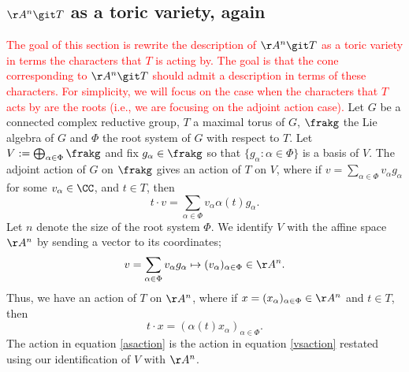 \subsection{$\AA^n \git T$ as a toric variety, again}
\textcolor{red}{The goal of this section is rewrite the description of $\AA^n \git T$ as a toric variety in terms the characters that $T$ is acting by.
The goal is that the cone corresponding to $\AA^n \git T$ should admit a description in terms of these characters.
For simplicity, we will focus on the case when the characters that $T$ acts by are the roots (i.e., we are focusing on the adjoint action case).}
Let $G$ be a connected complex reductive group, $T$ a maximal torus of $G$, $\frakg$ the Lie algebra of $G$ and $\Phi$ the root system of $G$ with respect to $T$.
Let $V := \bigoplus_{\alpha \in \Phi} \frakg$ and fix $g_\alpha \in \frakg$ so that $\{g_\alpha : \alpha \in \Phi\}$ is a basis of $V$.
The adjoint action of $G$ on $\frakg$ gives an action of $T$ on $V$, where if $v = \sum_{\alpha\in\Phi} v_\alpha g_\alpha$ for some $v_\alpha \in \CC$, and $t \in T$, then
\begin{equation}\label{vsaction}
t \cdot v = \sum_{\alpha \in \Phi} v_\alpha \alpha(t) g_\alpha.
\end{equation}
Let $n$ denote the size of the root system $\Phi$.
We identify $V$ with the affine space $\AA^n$ by sending a vector to its coordinates;
$$v = \sum_{\alpha \in \Phi} v_\alpha g_\alpha \mapsto (v_{\alpha})_{\alpha \in \Phi} \in \AA^n.$$
Thus, we have an action of $T$ on $\AA^n$, where if $x =(x_\alpha)_{\alpha\in\Phi} \in \AA^n$ and $t \in T$, then
\begin{equation}\label{asaction}
t \cdot x = (\alpha(t) x_\alpha)_{\alpha\in\Phi}.
\end{equation}
The action in equation \ref{asaction} is the action in equation \ref{vsaction} restated using our identification of $V$ with $\AA^n$.

